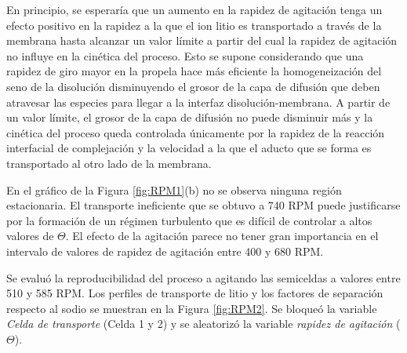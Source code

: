 En principio, se esperaría que un aumento en la rapidez de agitación tenga un efecto positivo en la rapidez a la que el ion litio es transportado a través de la membrana hasta alcanzar un valor límite a partir del cual la rapidez de agitación no influye en la cinética del proceso. Esto se supone considerando que una rapidez de giro mayor en la propela hace más eficiente la homogeneización del seno de la disolución disminuyendo el grosor de la capa de difusión que deben atravesar las especies para llegar a la interfaz disolución-membrana. A partir de un valor límite, el grosor de la capa de difusión no puede disminuir más y la cinética del proceso queda controlada únicamente por la rapidez de la reacción interfacial de complejación y la velocidad a la que el aducto que se forma es transportado al otro lado de la membrana. 

En el gráfico de la Figura \ref{fig:RPM1}(b) no se observa ninguna región estacionaria. El transporte ineficiente que se obtuvo a 740 RPM puede justificarse por la formación de un régimen turbulento que es difícil de controlar a altos valores de $\Theta$. El efecto de la agitación parece no tener gran importancia en el intervalo de valores de rapidez de agitación entre 400 y 680 RPM.

Se evaluó la reproducibilidad del proceso a agitando las semiceldas a valores entre 510 y 585 \ac{RPM}. Los perfiles de transporte de litio y los factores de separación respecto al sodio se muestran en la Figura \ref{fig:RPM2}. Se bloqueó la variable \textit{Celda de transporte} (Celda 1 y 2) y se aleatorizó la variable \textit{rapidez de agitación} ($\Theta$).

